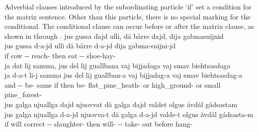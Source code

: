 Adverbial clauses introduced by the subordinating particle  ‘if’ set a condition for the matrix sentence. Other than this particle, there is no special marking for the conditional. 
The conditional clause can occur before or after the matrix clause, as shown in  through .%
\ea\label{conditionalClause1}%
\glll	jus gussa dajd ulli, dä bårre dajd, dija gabmasuijnid\\
	jus gussa d-a-jd ulli dä bårre d-a-jd dija gabma-suijni-jd\\
	if cow\BS{} -- reach- then eat\BS{} --  shoe-hay-\\\nopagebreak
{} 
\z
\ea\label{conditionalClause2}%
\glll	ja dat lij samma, jus del lij guallbana vaj bijjadaga vaj smav biehtsasdaga\\
	ja d-a-t li-j samma jus del lij guallban-a vaj bijjadag-a vaj smav biehtsasdag-a\\
	and -- be- same if then be- flat\_pine\_heath- or high\_ground- or small pine\_forest-\\\nopagebreak
{} 
\z
\ea\label{conditionalClause3}%
\glll	jus galga njuallga dajd njuovvat dä galga dajd valdet olgus åvdål gádsastam\\
	jus galga njuallga d-a-jd njuovva-t dä galga d-a-jd valde-t olgus åvdål gádsasta-m\\
	if will\BS{} correct -- slaughter- then will- -- take- out before hang-\\\nopagebreak
{} 
\z


